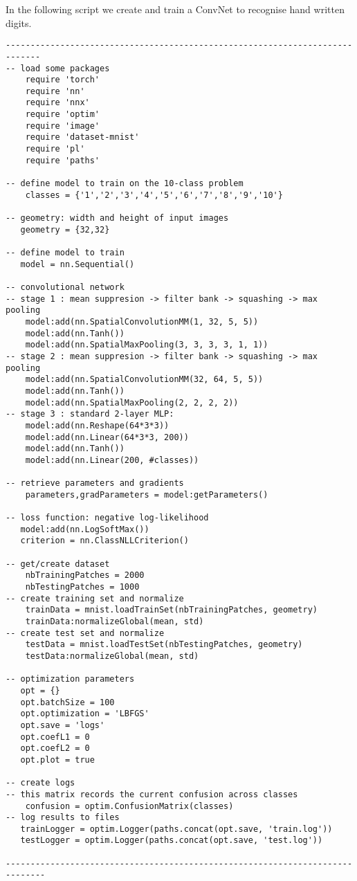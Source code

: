 In the following script we create and train a ConvNet to recognise hand written digits.

\small
\begin{verbatim}
-----------------------------------------------------------------------------
-- load some packages
    require 'torch'
    require 'nn'
    require 'nnx'
    require 'optim'
    require 'image'
    require 'dataset-mnist'
    require 'pl'
    require 'paths'

-- define model to train on the 10-class problem
    classes = {'1','2','3','4','5','6','7','8','9','10'}

-- geometry: width and height of input images
   geometry = {32,32}

-- define model to train
   model = nn.Sequential()

-- convolutional network
-- stage 1 : mean suppresion -> filter bank -> squashing -> max pooling
    model:add(nn.SpatialConvolutionMM(1, 32, 5, 5))
    model:add(nn.Tanh())
    model:add(nn.SpatialMaxPooling(3, 3, 3, 3, 1, 1))
-- stage 2 : mean suppresion -> filter bank -> squashing -> max pooling
    model:add(nn.SpatialConvolutionMM(32, 64, 5, 5))
    model:add(nn.Tanh())
    model:add(nn.SpatialMaxPooling(2, 2, 2, 2))
-- stage 3 : standard 2-layer MLP:
    model:add(nn.Reshape(64*3*3))
    model:add(nn.Linear(64*3*3, 200))
    model:add(nn.Tanh())
    model:add(nn.Linear(200, #classes))

-- retrieve parameters and gradients
    parameters,gradParameters = model:getParameters()

-- loss function: negative log-likelihood
   model:add(nn.LogSoftMax())
   criterion = nn.ClassNLLCriterion()
   
-- get/create dataset
    nbTrainingPatches = 2000
    nbTestingPatches = 1000
-- create training set and normalize
    trainData = mnist.loadTrainSet(nbTrainingPatches, geometry)
    trainData:normalizeGlobal(mean, std)
-- create test set and normalize
    testData = mnist.loadTestSet(nbTestingPatches, geometry)
    testData:normalizeGlobal(mean, std)

-- optimization parameters
   opt = {}
   opt.batchSize = 100
   opt.optimization = 'LBFGS'
   opt.save = 'logs'
   opt.coefL1 = 0
   opt.coefL2 = 0
   opt.plot = true
   
-- create logs
-- this matrix records the current confusion across classes
    confusion = optim.ConfusionMatrix(classes)
-- log results to files
   trainLogger = optim.Logger(paths.concat(opt.save, 'train.log'))
   testLogger = optim.Logger(paths.concat(opt.save, 'test.log'))

------------------------------------------------------------------------------
\end{verbatim}

